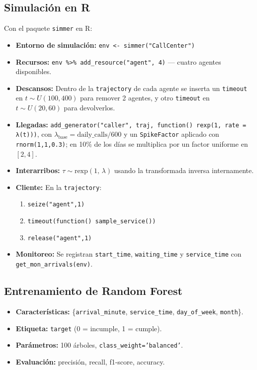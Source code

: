\documentclass[12pt]{article}
\begin{document}
\subsection{Simulación en R}
Con el paquete \texttt{simmer} en R:
\begin{itemize}
  \item \textbf{Entorno de simulación:}  
    \texttt{env <- simmer("CallCenter")}
  \item \textbf{Recursos:}  
    \texttt{env \%>\% add\_resource("agent", 4)} — cuatro agentes disponibles.
  \item \textbf{Descansos:}  
    Dentro de la \texttt{trajectory} de cada agente se inserta un \texttt{timeout} en  
    $t \sim U(100,400)$ para remover 2 agentes, y otro \texttt{timeout} en  
    $t \sim U(20,60)$ para devolverlos.
  \item \textbf{Llegadas:}  
    \texttt{add\_generator("caller", traj, function() rexp(1, rate = λ(t)))}, con  
    $\lambda_{\text{base}} = \text{daily\_calls}/600$ y un \texttt{SpikeFactor}  
    aplicado con \texttt{rnorm(1,1,0.3)}; en 10\% de los días se multiplica por un  
    factor uniforme en $[2,4]$.
  \item \textbf{Interarribos:}  
    $\tau \sim \mathrm{rexp}(1,\,\lambda)$ usando la transformada inversa internamente.
  \item \textbf{Cliente:}  
    En la \texttt{trajectory}:  
    \begin{enumerate}
      \item \texttt{seize("agent",1)}  
      \item \texttt{timeout(function() sample\_service())}  
      \item \texttt{release("agent",1)}
    \end{enumerate}
  \item \textbf{Monitoreo:}  
    Se registran \texttt{start\_time}, \texttt{waiting\_time} y \texttt{service\_time}  
    con \texttt{get\_mon\_arrivals(env)}.
\end{itemize}

\bigskip

\subsection{Entrenamiento de Random Forest}
\begin{itemize}
  \item \textbf{Características:} \{\texttt{arrival\_minute}, \texttt{service\_time}, \texttt{day\_of\_week}, \texttt{month}\}.
  \item \textbf{Etiqueta:} \texttt{target} (0 = incumple, 1 = cumple).
  \item \textbf{Parámetros:} 100 árboles, \texttt{class\_weight='balanced'}.
  \item \textbf{Evaluación:} precisión, recall, f1-score, accuracy.
\end{itemize}
\end{document}
